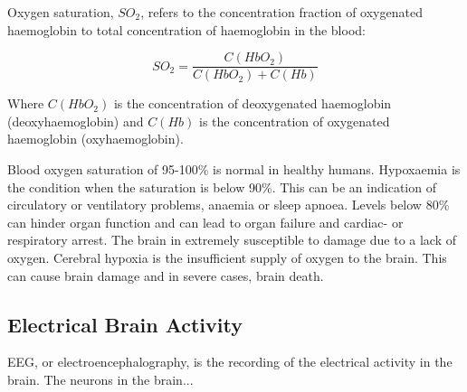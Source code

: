 \medskip
Oxygen saturation, $SO_2$, refers to the concentration fraction of oxygenated haemoglobin to total concentration of haemoglobin in the blood:

$$SO_2  =  \frac{C(HbO_2)}{C(HbO_2)+C(Hb)}$$

Where $C(HbO_2)$ is the concentration of deoxygenated haemoglobin (deoxyhaemoglobin) and $C(Hb)$ is the concentration of oxygenated haemoglobin (oxyhaemoglobin).

\medskip
Blood oxygen saturation of 95-100\% is normal in healthy humans. Hypoxaemia is the condition when the saturation is below 90\%. This can be an indication of circulatory or ventilatory problems, anaemia or sleep apnoea. Levels below 80\% can hinder organ function and can lead to organ failure and cardiac- or respiratory arrest. The brain in extremely susceptible to damage due to a lack of oxygen. Cerebral hypoxia is the insufficient supply of oxygen to the brain. This can cause brain damage and in severe cases, brain death.

\subsection{Electrical Brain Activity}
EEG, or electroencephalography, is the recording of the electrical activity in the brain. The neurons in the brain...





